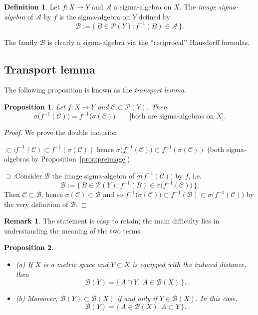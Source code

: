 \documentclass[12pt]{article}
\newtheorem{proposition}{Proposition}[section]
\theoremstyle{definition}
\newtheorem{definition}{Definition}[section]
\newtheorem{remark}{Remark}[section]
\begin{document}
\begin{definition}
Let $f:X\to Y$ and $\mathcal A$ a sigma-algebra on $X$. The \emph{image sigma-algebra} of $\mathcal A$ by $f$ is the sigma-algebra on $Y$ defined by
\[
\mathcal B:=\{\,B\in\mathcal P(Y): f^{-1}(B)\in\mathcal A\,\}.
\]
\end{definition}

The family $\mathcal B$ is clearly a sigma-algebra via the “reciprocal’’ Hausdorff formulas.

\subsection{Transport lemma}\label{subsec:3.3}

The following proposition is known as the \emph{transport lemma}.

\begin{proposition}\label{prop:transport}
Let $f:X\to Y$ and $\mathscr C\subset\mathcal P(Y)$. Then
\[
\sigma\bigl(f^{-1}(\mathscr C)\bigr)=f^{-1}\bigl(\sigma(\mathscr C)\bigr)
\qquad\text{[both are sigma-algebras on $X$].}
\]
\end{proposition}

\begin{proof}
We prove the double inclusion.

\noindent$\subset$:\quad $f^{-1}(\mathscr C)\subset f^{-1}(\sigma(\mathscr C))$ hence $\sigma\bigl(f^{-1}(\mathscr C)\bigr)\subset f^{-1}(\sigma(\mathscr C))$ (both sigma-algebras by Proposition~\ref{prop:preimage})

\noindent$\supset$:\quad Consider $\mathcal B$ the image sigma-algebra of $\sigma\bigl(f^{-1}(\mathscr C)\bigr)$ by $f$, i.e.
\[
\mathcal B:=\{\,B\in\mathcal P(Y): f^{-1}(B)\in \sigma\bigl(f^{-1}(\mathscr C)\bigr)\,\}.
\]
Then $\mathscr C\subset\mathcal B$, hence $\sigma(\mathscr C)\subset\mathcal B$ and so $f^{-1}\bigl(\sigma(\mathscr C)\bigr)\subset f^{-1}(\mathcal B)\subset \sigma\bigl(f^{-1}(\mathscr C)\bigr)$ by the very definition of $\mathcal B$.

\medskip\noindent

\end{proof}

\begin{remark}
The statement is easy to retain; the main difficulty lies in understanding the meaning of the two terms.
\end{remark}

\begin{proposition}\label{prop:traceBorel}
\begin{itemize}
\item (a) If $X$ is a metric space and $Y\subset X$ is equipped with the induced distance, then
\[
\mathcal B(Y)=\{\,A\cap Y,\ A\in\mathcal B(X)\,\}.
\]
\item (b) Moreover, $\mathcal B(Y)\subset\mathcal B(X)$ if and only if $Y\in\mathcal B(X)$. In this case,
\[
\mathcal B(Y)=\{\,A\in\mathcal B(X): A\subset Y\,\}.
\]
\end{itemize}
\end{proposition}
\end{document}
